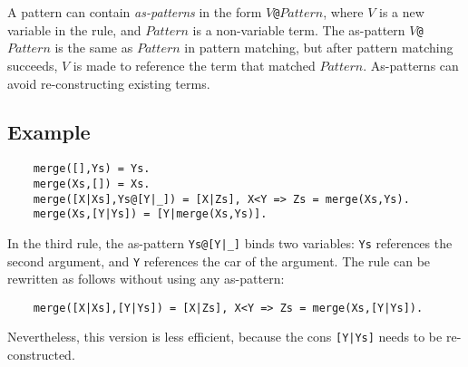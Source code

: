 A pattern can contain \emph{as-patterns} in the form \texttt{$V$@$Pattern$}, where $V$ is a new variable in the rule, and $Pattern$ is a non-variable term. The as-pattern \texttt{$V$@$Pattern$} is the same as \texttt{$Pattern$} in pattern matching, but after pattern matching succeeds, $V$ is made to reference the term that matched $Pattern$. As-patterns can avoid re-constructing existing terms.

\subsection*{Example}
\begin{verbatim}
    merge([],Ys) = Ys.
    merge(Xs,[]) = Xs.
    merge([X|Xs],Ys@[Y|_]) = [X|Zs], X<Y => Zs = merge(Xs,Ys). 
    merge(Xs,[Y|Ys]) = [Y|merge(Xs,Ys)].
\end{verbatim}
In the third rule, the as-pattern \texttt{Ys@[Y|\_]} binds two variables: \texttt{Ys} references the second argument, and \texttt{Y} references the car of the argument. The rule can be rewritten as follows without using any as-pattern:
\begin{verbatim}
    merge([X|Xs],[Y|Ys]) = [X|Zs], X<Y => Zs = merge(Xs,[Y|Ys]). 
\end{verbatim}
Nevertheless, this version is less efficient, because the cons \texttt{[Y|Ys]} needs to be re-constructed.

